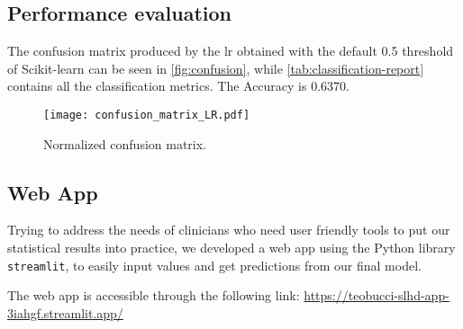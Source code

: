 


\subsection{Performance evaluation}

The confusion matrix produced by the \gls{lr} obtained with the default 0.5 threshold of Scikit-learn can be seen in \autoref{fig:confusion}, while \autoref{tab:classification-report} contains all the classification metrics. The Accuracy is 0.6370.

\begin{figure}[htpb]
\centering
\texttt{[image: confusion\_matrix\_LR.pdf]}
\caption{Normalized confusion matrix.}
\label{fig:confusion}
\end{figure}



\subsection{Web App}

Trying to address the needs of clinicians who need user friendly tools to put our statistical results into practice, we developed a web app using the Python library \texttt{streamlit}, to easily input values and get predictions from our final model.

The web app is accessible through the following link:
\url{https://teobucci-slhd-app-3iahgf.streamlit.app/}
